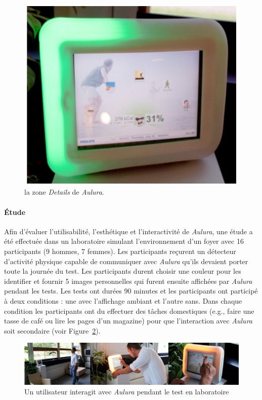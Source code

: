 \documentclass[10pt,a5paper,twoside]{article}
\begin{document}
\begin{figure}
\centering
\includegraphics[width=0.900\hsize]{images/Aulura-screenshot2.png}
\caption{la zone \emph{Details} de \emph{Aulura}.}\label{fig:aulura2}
\end{figure}

\paragraph{Étude}\label{uxe9tude-3}

Afin d'évaluer l'utilisabilité, l'esthétique et l'interactivité de
\emph{Aulura}, une étude a été effectuée dans un laboratoire simulant
l'environnement d'un foyer avec 16 participants (9 hommes, 7 femmes).
Les participants reçurent un détecteur d'activité physique capable de
communiquer avec \emph{Aulura} qu'ils devaient porter toute la journée
du test. Les participants durent choisir une couleur pour les identifier
et fournir 5 images personnelles qui furent ensuite affichées par
\emph{Aulura} pendant les tests. Les tests ont durées 90 minutes et les
participants ont participé à deux conditions : une avec l'affichage
ambiant et l'autre sans. Dans chaque condition les participants ont du
effectuer des tâches domestiques (e.g., faire une tasse de café ou lire
les pages d'un magazine) pour que l'interaction avec \emph{Aulura} soit
secondaire (voir Figure~\ref{fig:aulura2}).

\begin{figure}
\centering
\includegraphics[width=0.900\hsize]{images/Aulura-screenshot1.png}
\caption{Un utilisateur interagit avec \emph{Aulura} pendant le test en
laboratoire}\label{fig:aulura2}
\end{figure}
\end{document}
